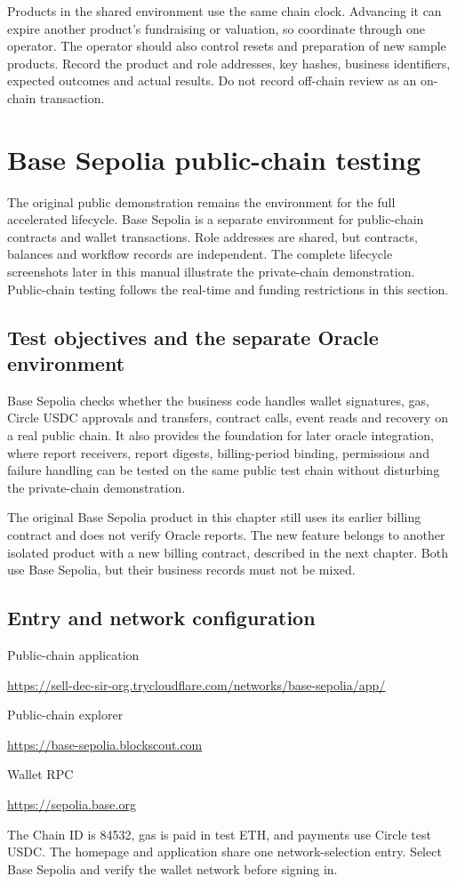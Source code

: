 \documentclass[12pt,a4paper]{article}
\begin{document}
Products in the shared environment use the same chain clock. Advancing it can expire another product's fundraising or valuation, so coordinate through one operator. The operator should also control resets and preparation of new sample products. Record the product and role addresses, key hashes, business identifiers, expected outcomes and actual results. Do not record off-chain review as an on-chain transaction.

\clearpage\section{Base Sepolia public-chain testing}
The original public demonstration remains the environment for the full accelerated lifecycle. Base Sepolia is a separate environment for public-chain contracts and wallet transactions. Role addresses are shared, but contracts, balances and workflow records are independent. The complete lifecycle screenshots later in this manual illustrate the private-chain demonstration. Public-chain testing follows the real-time and funding restrictions in this section.

\subsection{Test objectives and the separate Oracle environment}
Base Sepolia checks whether the business code handles wallet signatures, gas, Circle USDC approvals and transfers, contract calls, event reads and recovery on a real public chain. It also provides the foundation for later oracle integration, where report receivers, report digests, billing-period binding, permissions and failure handling can be tested on the same public test chain without disturbing the private-chain demonstration.

The original Base Sepolia product in this chapter still uses its earlier billing contract and does not verify Oracle reports. The new feature belongs to another isolated product with a new billing contract, described in the next chapter. Both use Base Sepolia, but their business records must not be mixed.

\subsection{Entry and network configuration}
Public-chain application\par\url{https://sell-dec-sir-org.trycloudflare.com/networks/base-sepolia/app/}\par
Public-chain explorer\par\url{https://base-sepolia.blockscout.com}\par
Wallet RPC\par\url{https://sepolia.base.org}\par
The Chain ID is 84532, gas is paid in test ETH, and payments use Circle test USDC. The homepage and application share one network-selection entry. Select Base Sepolia and verify the wallet network before signing in.
\end{document}
